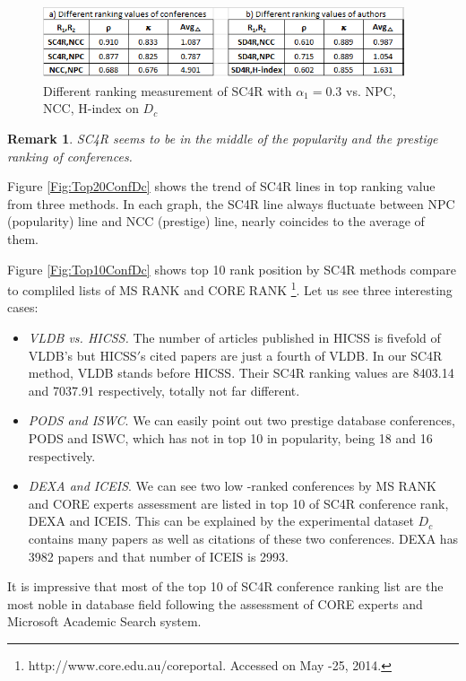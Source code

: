 \documentclass[10pt,leqno,twoside]{article}
\newtheorem{remark}{\indent Remark}[section]
\begin{document}
\begin{figure}
	\caption{Different ranking measurement of SC4R with $\alpha_1=0.3$ vs. NPC, NCC, H-index on $D_c$}
	\label{Fig:DiffRank}
    \centering
    \includegraphics[width=0.95\textwidth]{DiffRank}
\end{figure}
%
%
\begin{remark}
SC4R seems to be in the middle of the popularity and the prestige ranking of conferences.
\end{remark}
Figure \ref{Fig:Top20ConfDc} shows the trend of SC4R lines in top ranking value from three methods. In each graph, the SC4R line always fluctuate between NPC (popularity) line and NCC (prestige) line, nearly coincides to the average of them. 


Figure \ref{Fig:Top10ConfDc} shows top 10 rank position by SC4R methods compare to compliled lists of MS RANK \cite{microsoft} and CORE RANK \footnote{http://www.core.edu.au/coreportal. Accessed on May -25, 2014.}.  
Let us see three interesting cases:
\begin{itemize} 
\item \textit{VLDB vs. HICSS.} The number of articles published in HICSS is fivefold of VLDB's but HICSS$'$s cited papers are just a fourth of VLDB. In our SC4R method, VLDB stands before HICSS. Their SC4R ranking values are 8403.14 and 7037.91 respectively, totally not far different.

\item \textit{PODS and ISWC}. We can easily point out two prestige database conferences, PODS and ISWC, which has not in top 10 in popularity, being 18 and 16 respectively.

\item \textit{DEXA and ICEIS}. We can see two low -ranked conferences by MS RANK and CORE experts assessment are listed in top 10 of SC4R conference rank, DEXA and ICEIS. This can be explained by the experimental dataset $D_c$ contains many papers as well as citations of these two conferences. DEXA has 3982 papers and that number of ICEIS is 2993.
\end{itemize}

It is impressive that most of the top 10 of SC4R conference ranking list are the most noble in database field following the assessment of CORE experts and Microsoft Academic Search system.
\end{document}
